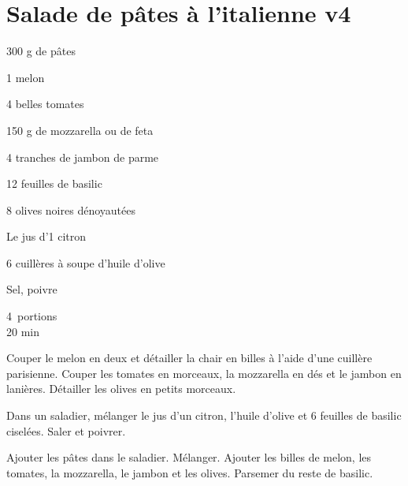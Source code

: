 \section{Salade de pâtes à l'italienne v4}		%
\begin{ingredients}	
 300 g de p\^ates\par
1 melon\par
4 belles tomates\par
150 g de mozzarella ou de feta \par
4 tranches de jambon de parme \par
12 feuilles de basilic \par
8 olives noires d\'enoyaut\'ees\par
Le jus d'1 citron\par
6 cuill\`eres \`a soupe d'huile d'olive\par
Sel, poivre
\end{ingredients}

\begin{infos}
	4 portions\\
	20 min
\end{infos}

\begin{etapes}
	\item Couper le melon en deux et détailler la chair en billes à l'aide d'une cuillère parisienne. Couper les tomates en morceaux, la mozzarella en dés et le jambon en lanières. Détailler les olives en petits morceaux.
	\item Dans un saladier, mélanger le jus d'un citron, l'huile d'olive et 6 feuilles de basilic ciselées. Saler et poivrer.
	\item Ajouter les pâtes dans le saladier. Mélanger. Ajouter les billes de melon, les tomates, la mozzarella, le jambon et les olives. Parsemer du reste de basilic.
\end{etapes}
